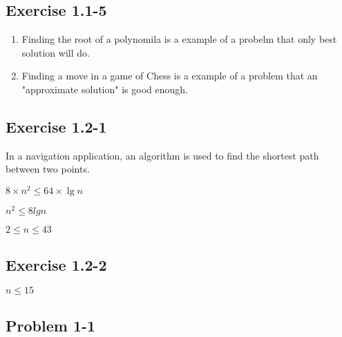 \documentclass{book}
\begin{document}
\subsection{Exercise 1.1-5}
\begin{enumerate}
    \item Finding the root of a polynomila is a example of a probelm that only 
    best solution will do.
    \item Finding a move in a game of Chess is a example of a problem that an 
    "approximate solution" is good enough.
\end{enumerate}
\subsection{Exercise 1.2-1}
In a navigation application, an algorithm is used to find the shortest path 
between two points.

$8 \times n^2 \leq{64 \times \lg{n}}$

$n^2 \leq{8lg{n}}$

$ 2 \leq{n} \leq{43}$

\subsection{Exercise 1.2-2}

$ n \leq{15}$

\subsection{Problem 1-1}
\end{document}
